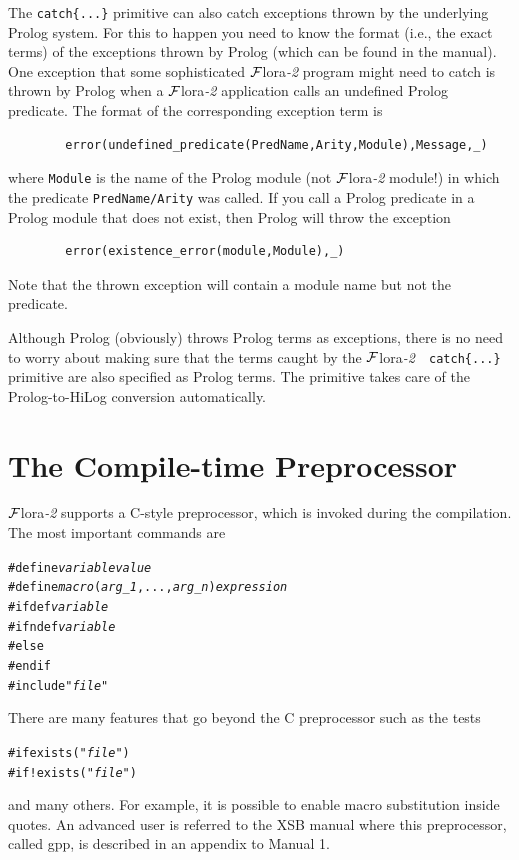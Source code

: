 \documentclass[11pt]{article}
\newcommand{\FLSYSTEM}{{\mbox{\sc ${\cal F}${lora}\rm\emph{-2}}}\xspace}
\begin{document}
The {\tt catch\{...\}} primitive can also catch exceptions thrown by the
underlying Prolog system. For this to happen you need to know the format
(i.e., the exact terms) of the exceptions thrown by Prolog (which can
be found in the manual). One exception that some sophisticated \FLSYSTEM
program might need to catch is thrown by Prolog when a \FLSYSTEM application
calls an undefined Prolog predicate. The format of the corresponding
exception term is
\begin{verbatim}
        error(undefined_predicate(PredName,Arity,Module),Message,_)  
\end{verbatim}
where {\tt Module} is the name of the Prolog module (not \FLSYSTEM module!) in
which the predicate {\tt PredName/Arity} was called. If you call a Prolog
predicate in a Prolog module that does not exist, then Prolog will throw
the exception
\begin{verbatim}
        error(existence_error(module,Module),_)  
\end{verbatim}
Note that the thrown exception will contain a module name but not the predicate.

Although Prolog (obviously) throws Prolog terms as exceptions, there is no
need to worry about making sure that the terms caught by the \FLSYSTEM\, {\tt
  catch\{...\}} primitive are also specified as Prolog terms. The primitive
takes care of the Prolog-to-HiLog conversion automatically.



\section{The Compile-time Preprocessor}

\FLSYSTEM supports a C-style preprocessor, which is invoked during the
compilation. The most important commands are
\begin{alltt}
   #define \emph{variable} \emph{value} 
   #define \emph{macro}(\emph{arg_1},...,\emph{arg_n}) \emph{expression} 
   #ifdef \emph{variable} 
   #ifndef \emph{variable} 
   #else
   #endif
   #include "\emph{file}" 
\end{alltt}
There are many features that go beyond the C preprocessor such as the tests
\begin{alltt}
   #if exists("\emph{file}") 
   #if !exists("\emph{file}") 
\end{alltt}
and many others. For example, it is possible to enable macro substitution
inside quotes. An advanced user is referred to the XSB manual where this
preprocessor, called gpp, is described in an appendix to Manual 1.
\end{document}
